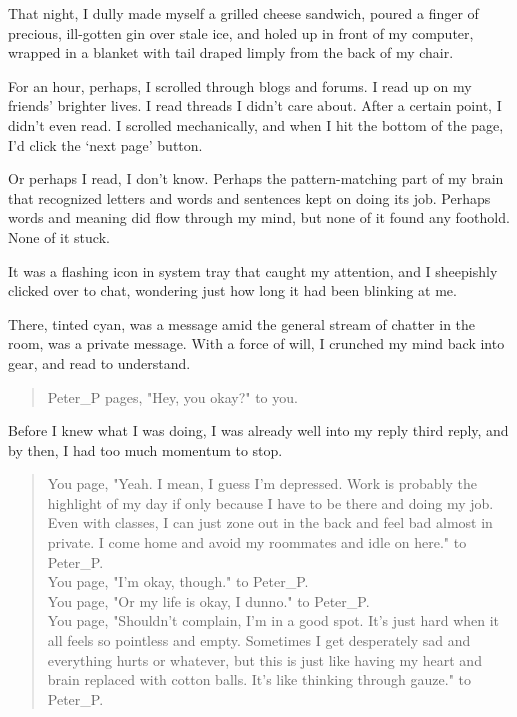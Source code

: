 That night, I dully made myself a grilled cheese sandwich, poured a finger of precious, ill-gotten gin over stale ice, and holed up in front of my computer, wrapped in a blanket with tail draped limply from the back of my chair.

For an hour, perhaps, I scrolled through blogs and forums. I read up on my friends' brighter lives. I read threads I didn't care about. After a certain point, I didn't even read. I scrolled mechanically, and when I hit the bottom of the page, I'd click the `next page' button.

Or perhaps I read, I don't know. Perhaps the pattern-matching part of my brain that recognized letters and words and sentences kept on doing its job. Perhaps words and meaning did flow through my mind, but none of it found any foothold. None of it stuck.

It was a flashing icon in system tray that caught my attention, and I sheepishly clicked over to chat, wondering just how long it had been blinking at me.

There, tinted cyan, was a message amid the general stream of chatter in the room, was a private message. With a force of will, I crunched my mind back into gear, and read to understand.

\begin{verse}
    {\ttfamily
Peter\_P pages, "Hey, you okay?" to you.}
\end{verse}

Before I knew what I was doing, I was already well into my reply third reply, and by then, I had too much momentum to stop.

\begin{verse}
    {\ttfamily
You page, "Yeah. I mean, I guess I'm depressed. Work is probably the highlight of my day if only because I have to be there and doing my job. Even with classes, I can just zone out in the back and feel bad almost in private. I come home and avoid my roommates and idle on here." to Peter\_P.\\
You page, "I'm okay, though." to Peter\_P.\\
You page, "Or my life is okay, I dunno." to Peter\_P.\\
You page, "Shouldn't complain, I'm in a good spot. It's just hard when it all feels so pointless and empty. Sometimes I get desperately sad and everything hurts or whatever, but this is just like having my heart and brain replaced with cotton balls. It's like thinking through gauze." to Peter\_P.}
\end{verse}

